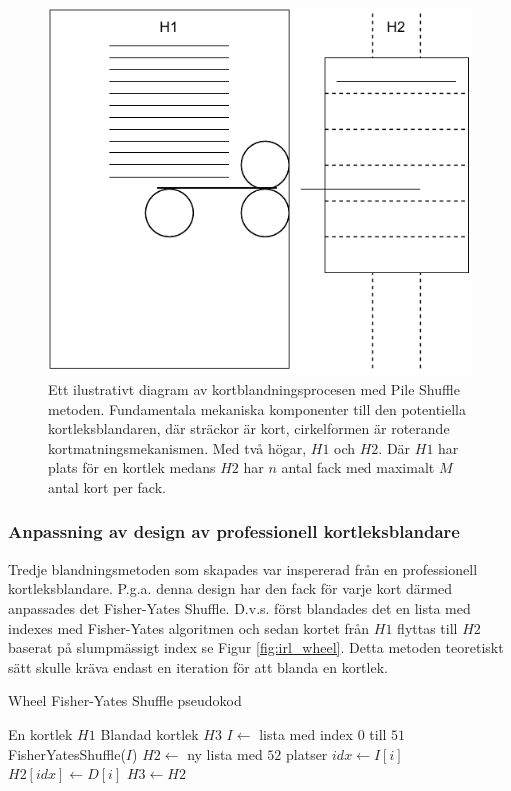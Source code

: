 \documentclass[swedish,a4paper]{article}
\begin{document}
\begin{figure}[H]
	\centering
	\includegraphics[width=0.4\linewidth]{irl_pile_shuffle.pdf}
	\captionsetup{width=0.5\textwidth} \caption{Ett ilustrativt diagram av
		kortblandningsprocesen med 
	Pile Shuffle metoden. Fundamentala mekaniska komponenter till den potentiella
	kortleksblandaren, där sträckor är kort, cirkelformen är roterande
kortmatningsmekanismen. Med två högar, $H1$ och $H2$. Där $H1$ har plats för en
kortlek medans $H2$ har $n$ antal fack med maximalt $M$ antal kort per fack.}
	\label{fig:irl_pile}
	
\end{figure}

\subsubsection{Anpassning av design av professionell kortleksblandare}
Tredje blandningsmetoden som skapades var inspererad från en professionell
kortleksblandare. P.g.a. denna design har den fack för varje kort därmed anpassades det
Fisher-Yates Shuffle.
D.v.s. först blandades det en lista med indexes med
Fisher-Yates algoritmen och sedan kortet från $H1$ flyttas till $H2$ baserat på
slumpmässigt index se Figur \ref{fig:irl_wheel}. Detta metoden teoretiskt sätt
skulle kräva endast en iteration för att blanda en kortlek.

\begin{algorithm}
\caption{Wheel Fisher-Yates Shuffle pseudokod}
\label{alg:wheel}
\begin{algorithmic}[1]
\Require En kortlek $H1$
\Ensure Blandad kortlek $H3$ 
\State $I \gets$ lista med index $0$ till $51$ 
\State FisherYatesShuffle($I$) 
\State $H2 \gets$ ny lista med $52$ platser 
    \State $idx \gets I[i]$ 
    \State $H2[idx] \gets D[i]$ 
\EndFor
\State $H3 \gets H2$ 
\end{algorithmic}
\end{algorithm}
\end{document}
